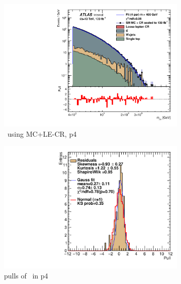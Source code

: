 \begin{figure}[H]
    \centering
    \begin{subfigure}[h]{0.38\linewidth}
    \includegraphics[scale=0.3]{figs/ch6/fit/variable_nosmooth/p4/10PB/output_SMMCplusCR_Mjm_p4.pdf}%
    \caption{\mjmu \ using MC+LE-CR, p4}
    \end{subfigure}
    \hfill
    \begin{subfigure}[h]{0.4\linewidth}
    \includegraphics[scale=0.32]{figs/ch6/fit/variable_nosmooth/p4/10PB/pull_SMMCplusCR_Mjm_p4.pdf}%
    \caption{pulls of \mjmu \ in p4}
    \end{subfigure}
    \hfill
    \begin{subfigure}[h]{0.38\linewidth}

\end{subfigure}
\end{figure}
